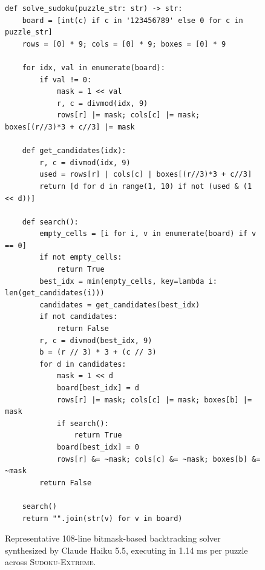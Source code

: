 \documentclass{article} %
\begin{document}
\begin{figure}[h]
\begin{center}
\begin{minipage}{0.95\linewidth}
\small
\begin{verbatim}
def solve_sudoku(puzzle_str: str) -> str:
    board = [int(c) if c in '123456789' else 0 for c in puzzle_str]
    rows = [0] * 9; cols = [0] * 9; boxes = [0] * 9

    for idx, val in enumerate(board):
        if val != 0:
            mask = 1 << val
            r, c = divmod(idx, 9)
            rows[r] |= mask; cols[c] |= mask; boxes[(r//3)*3 + c//3] |= mask

    def get_candidates(idx):
        r, c = divmod(idx, 9)
        used = rows[r] | cols[c] | boxes[(r//3)*3 + c//3]
        return [d for d in range(1, 10) if not (used & (1 << d))]

    def search():
        empty_cells = [i for i, v in enumerate(board) if v == 0]
        if not empty_cells:
            return True
        best_idx = min(empty_cells, key=lambda i: len(get_candidates(i)))
        candidates = get_candidates(best_idx)
        if not candidates:
            return False
        r, c = divmod(best_idx, 9)
        b = (r // 3) * 3 + (c // 3)
        for d in candidates:
            mask = 1 << d
            board[best_idx] = d
            rows[r] |= mask; cols[c] |= mask; boxes[b] |= mask
            if search():
                return True
            board[best_idx] = 0
            rows[r] &= ~mask; cols[c] &= ~mask; boxes[b] &= ~mask
        return False

    search()
    return "".join(str(v) for v in board)
\end{verbatim}
\end{minipage}
\end{center}
\caption{Representative 108-line bitmask-based backtracking solver synthesized by Claude Haiku 5.5, executing in 1.14 ms per puzzle across \textsc{Sudoku-Extreme}.}
\label{lst:solver_sample}
\end{figure}
\end{document}
